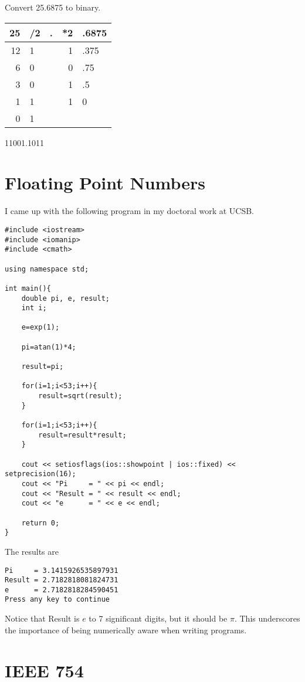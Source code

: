 Convert 25.6875 to binary.

    {\color{ans}
    \begin{tabular}{r|lcr|l}
    25 & /2 &.& *2 & .6875 \\ \hline
    12 & 1  & &  1 & .375  \\
     6 & 0  & &  0 & .75   \\
     3 & 0  & &  1 & .5    \\
     1 & 1  & &  1 & 0     \\
     0 & 1  & &    &
     \end{tabular}

     11001.1011
    }


\section{Floating Point Numbers}

I came up with the following program in my doctoral work at UCSB.

\begin{verbatim}
#include <iostream>
#include <iomanip>
#include <cmath>

using namespace std;

int main(){
    double pi, e, result;
    int i;

    e=exp(1);

    pi=atan(1)*4;

    result=pi;

    for(i=1;i<53;i++){
        result=sqrt(result);
    }

    for(i=1;i<53;i++){
        result=result*result;
    }

    cout << setiosflags(ios::showpoint | ios::fixed) << setprecision(16);
    cout << "Pi     = " << pi << endl;
    cout << "Result = " << result << endl;
    cout << "e      = " << e << endl;

    return 0;
}
\end{verbatim}

The results are

\begin{verbatim}
Pi     = 3.1415926535897931
Result = 2.7182818081824731
e      = 2.7182818284590451
Press any key to continue
\end{verbatim}

Notice that Result is $e$ to 7 significant digits, but it should be $\pi$.  This underscores the importance of being numerically aware when writing programs.


\section{IEEE 754}

